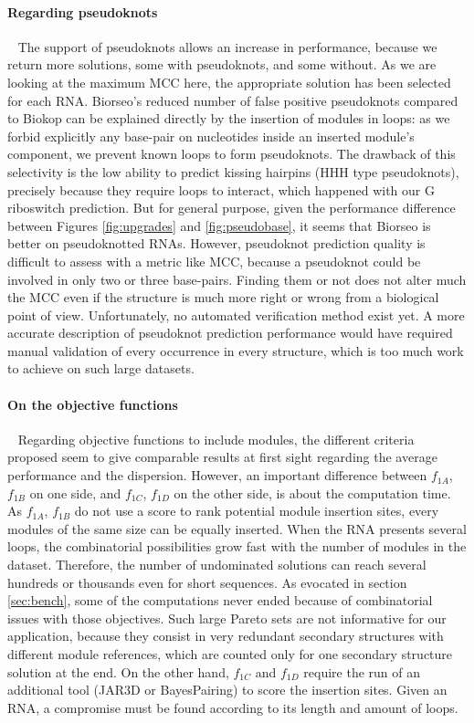 \documentclass{bioinfo}
\begin{document}
\paragraph{Regarding pseudoknots} ~ The support of pseudoknots allows an increase in performance, because we return more solutions, some with pseudoknots, and some without. As we are looking at the maximum MCC here, the appropriate solution has been selected for each RNA. 
Biorseo's reduced number of false positive pseudoknots compared to Biokop can be explained directly by the insertion of modules in loops: as we forbid explicitly any base-pair on nucleotides inside an inserted module's component, we prevent known loops to form pseudoknots. The drawback of this selectivity is the low ability to predict kissing hairpins (HHH type pseudoknots), precisely because they require loops to interact, which happened with our G riboswitch prediction. But for general purpose, given the performance difference between Figures \ref{fig:upgrades} and \ref{fig:pseudobase}, it seems that Biorseo is better on pseudoknotted RNAs.
However, pseudoknot prediction quality is difficult to assess with a metric like MCC, because a pseudoknot could be involved in only two or three base-pairs. Finding them or not does not alter much the MCC even if the structure is much more right or wrong from a biological point of view. Unfortunately, no automated verification method exist yet. A more accurate description of pseudoknot prediction performance would have required manual validation of every occurrence in every structure, which is too much work to achieve on such large datasets.

\paragraph{On the objective functions} ~ 
Regarding objective functions to include modules, the different criteria proposed seem to give comparable results at first sight regarding the average performance and the dispersion. However, an important difference between $f_{1A}$, $f_{1B}$ on one side, and $f_{1C}$, $f_{1D}$ on the other side, is about the computation time. As $f_{1A}$, $f_{1B}$ do not use a score to rank potential module insertion sites, every modules of the same size can be equally inserted. When the RNA presents several loops, the combinatorial possibilities grow fast with the number of modules in the dataset. Therefore, the number of undominated solutions can reach several hundreds or thousands even for short sequences. As evocated in section \ref{sec:bench}, some of the computations never ended because of combinatorial issues with those objectives. Such large Pareto sets are not informative for our application, because they consist in very redundant secondary structures with different module references, which are counted only for one secondary structure solution at the end. On the other hand, $f_{1C}$ and $f_{1D}$ require the run of an additional tool (JAR3D or BayesPairing) to score the insertion sites. Given an RNA, a compromise must be found according to its length and amount of loops.
\end{document}
